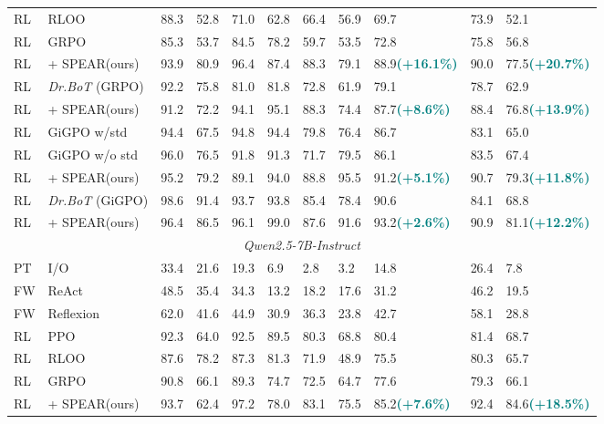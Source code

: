 \documentclass[]{youtu} %
\newcommand{\method}{\textsc{SPEAR}\xspace}
\begin{document}
\begin{table}[htbp]
{{{\begin{tabular}{lllllllllll}
RL & RLOO & 88.3 & 52.8 & 71.0 & 62.8 & 66.4 & 56.9 & 69.7 & 73.9 & 52.1 \\
\rowcolor[gray]{.95}
RL & GRPO & 85.3 & 53.7 & 84.5 & 78.2 & 59.7 & 53.5 & 72.8 & 75.8 & 56.8 \\
\rowcolor{c2}
RL & + \method (ours) & 93.9 & 80.9 & 96.4 & 87.4 & 88.3 & 79.1 & 88.9{\tiny \textbf{\textcolor{teal}{(+16.1\%)}}} & 90.0 & 77.5{\tiny \textbf{\textcolor{teal}{(+20.7\%)}}} \\
\rowcolor[gray]{.95}
RL & \textit{Dr.BoT} (GRPO) & 92.2 & 75.8 & 81.0 & 81.8 & 72.8 & 61.9 & 79.1 & 78.7 & 62.9 \\
\rowcolor{c2}
RL & + \method (ours) & 91.2 & 72.2 & 94.1 & 95.1 & 88.3 & 74.4 & 87.7{\tiny \textbf{\textcolor{teal}{(+8.6\%)}}} & 88.4  & 76.8{\tiny \textbf{\textcolor{teal}{(+13.9\%)}}} \\
RL & GiGPO w/std & 94.4 & 67.5 & 94.8 & 94.4 & 79.8 & 76.4 & 86.7 & 83.1 & 65.0 \\
\rowcolor[gray]{.95}
RL & GiGPO w/o std & 96.0 & 76.5 & 91.8 & 91.3 & 71.7 & 79.5 & 86.1 & 83.5 & 67.4 \\
\rowcolor{c2}
RL & + \method (ours) & 95.2 & 79.2 & 89.1 & 94.0 & 88.8 & 95.5 & 91.2{\tiny \textbf{\textcolor{teal}{(+5.1\%)}}} & 90.7 & 79.3{\tiny \textbf{\textcolor{teal}{(+11.8\%)}}} \\
\rowcolor[gray]{.95}
RL & \textit{Dr.BoT} (GiGPO) & 98.6 & 91.4 & 93.7 & 93.8 & 85.4 & 78.4 & 90.6 & 84.1 & 68.8  \\
\rowcolor{c2}
RL & + \method (ours) & 96.4 & 86.5 & 96.1 & 99.0 & 87.6 & 91.6 & 93.2{\tiny \textbf{\textcolor{teal}{(+2.6\%)}}} & 90.9 & 81.1{\tiny \textbf{\textcolor{teal}{(+12.2\%)}}} \\
\midrule
\multicolumn{11}{c}{\textit{Qwen2.5-7B-Instruct}} \\
PT & I/O & 33.4 & 21.6 & 19.3 & 6.9 & 2.8 & 3.2 & 14.8 & 26.4 & 7.8 \\
FW & ReAct & 48.5 & 35.4 & 34.3 & 13.2 & 18.2 & 17.6 & 31.2 & 46.2 & 19.5 \\
FW & Reflexion & 62.0 & 41.6 & 44.9 & 30.9 & 36.3 & 23.8 & 42.7 & 58.1 & 28.8 \\
RL & PPO & 92.3 & 64.0 & 92.5 & 89.5 & 80.3 & 68.8 & 80.4 & 81.4 & 68.7 \\
RL & RLOO & 87.6 & 78.2 & 87.3 & 81.3 & 71.9 & 48.9 & 75.5 & 80.3 & 65.7 \\
\rowcolor[gray]{.95}
RL & GRPO & 90.8 & 66.1 & 89.3 & 74.7 & 72.5 & 64.7 & 77.6 & 79.3 & 66.1 \\
\rowcolor{c2}
RL & + \method (ours) & 93.7 & 62.4  &  97.2  & 78.0  & 83.1 & 75.5 & 85.2{\tiny \textbf{\textcolor{teal}{(+7.6\%)}}} & 92.4 & 84.6{\tiny \textbf{\textcolor{teal}{(+18.5\%)}}} \\

\end{tabular}}}}
\end{table}
\end{document}
